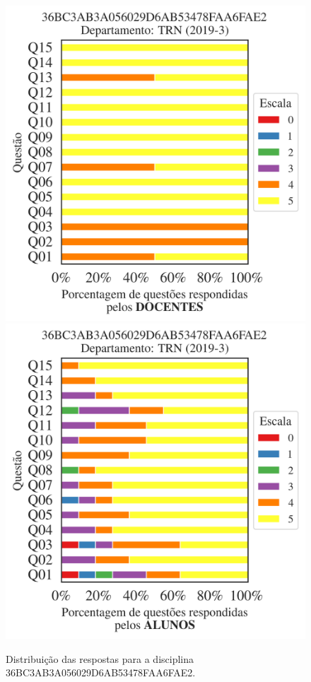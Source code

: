 \documentclass[a4paper,10pt]{article}
\begin{document}
\begin{figure}[h]
\centering
\includegraphics[width=0.485\linewidth]{analise_disciplina_departamento_TRN_36BC3AB3A056029D6AB53478FAA6FAE2_docentes.png}
\includegraphics[width=0.485\linewidth]{analise_disciplina_departamento_TRN_36BC3AB3A056029D6AB53478FAA6FAE2_alunos.png}
\caption{\label{fig:analise_geral_departamento}                Distribuição das respostas para a disciplina 36BC3AB3A056029D6AB53478FAA6FAE2. }
\end{figure}
\end{document}
